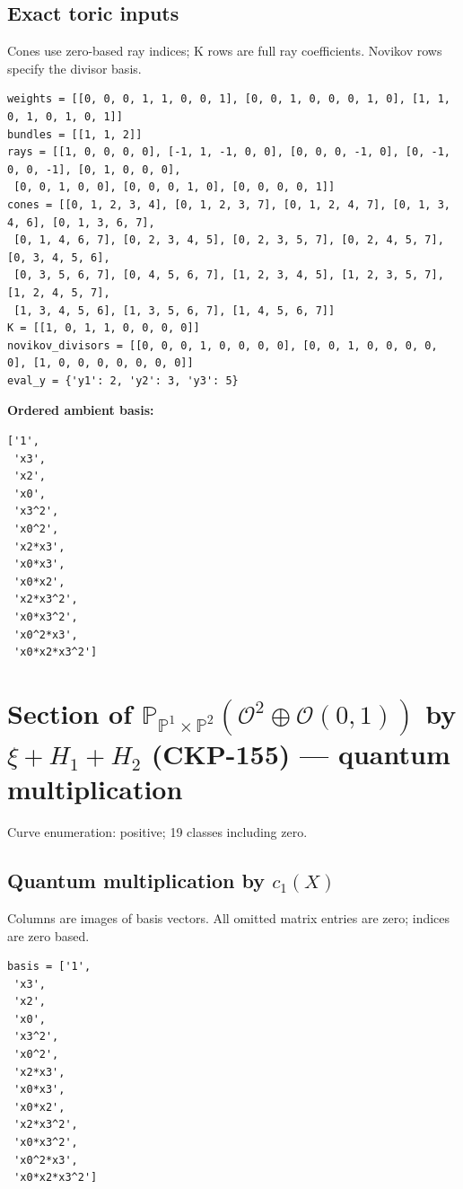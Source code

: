 \documentclass[10pt,a4paper]{article}
\begin{document}
\subsection*{Exact toric inputs}
Cones use zero-based ray indices; K rows are full ray coefficients. Novikov rows specify the divisor basis.

\begin{lstlisting}
weights = [[0, 0, 0, 1, 1, 0, 0, 1], [0, 0, 1, 0, 0, 0, 1, 0], [1, 1, 0, 1, 0, 1, 0, 1]]
bundles = [[1, 1, 2]]
rays = [[1, 0, 0, 0, 0], [-1, 1, -1, 0, 0], [0, 0, 0, -1, 0], [0, -1, 0, 0, -1], [0, 1, 0, 0, 0],
 [0, 0, 1, 0, 0], [0, 0, 0, 1, 0], [0, 0, 0, 0, 1]]
cones = [[0, 1, 2, 3, 4], [0, 1, 2, 3, 7], [0, 1, 2, 4, 7], [0, 1, 3, 4, 6], [0, 1, 3, 6, 7],
 [0, 1, 4, 6, 7], [0, 2, 3, 4, 5], [0, 2, 3, 5, 7], [0, 2, 4, 5, 7], [0, 3, 4, 5, 6],
 [0, 3, 5, 6, 7], [0, 4, 5, 6, 7], [1, 2, 3, 4, 5], [1, 2, 3, 5, 7], [1, 2, 4, 5, 7],
 [1, 3, 4, 5, 6], [1, 3, 5, 6, 7], [1, 4, 5, 6, 7]]
K = [[1, 0, 1, 1, 0, 0, 0, 0]]
novikov_divisors = [[0, 0, 0, 1, 0, 0, 0, 0], [0, 0, 1, 0, 0, 0, 0, 0], [1, 0, 0, 0, 0, 0, 0, 0]]
eval_y = {'y1': 2, 'y2': 3, 'y3': 5}
\end{lstlisting}

\textbf{Ordered ambient basis:}
\begin{lstlisting}
['1',
 'x3',
 'x2',
 'x0',
 'x3^2',
 'x0^2',
 'x2*x3',
 'x0*x3',
 'x0*x2',
 'x2*x3^2',
 'x0*x3^2',
 'x0^2*x3',
 'x0*x2*x3^2']
\end{lstlisting}

\clearpage\section*{Section of $\mathbb P_{\mathbb P^{1}\times \mathbb P^{2}}(\mathcal O^{2}\oplus \mathcal O(0,1))$ by $\xi +H_{1}+H_{2}$ (CKP-155) --- quantum multiplication}

Curve enumeration: positive; 19 classes including zero.
\subsection*{Quantum multiplication by $c_1(X)$}
Columns are images of basis vectors. All omitted matrix entries are zero; indices are zero based.

\begin{lstlisting}
basis = ['1',
 'x3',
 'x2',
 'x0',
 'x3^2',
 'x0^2',
 'x2*x3',
 'x0*x3',
 'x0*x2',
 'x2*x3^2',
 'x0*x3^2',
 'x0^2*x3',
 'x0*x2*x3^2']
\end{lstlisting}
\end{document}
